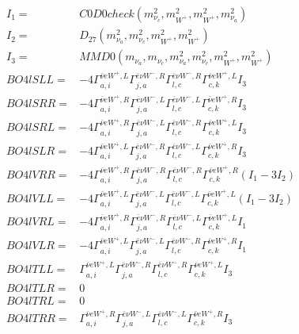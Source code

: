 \documentclass[A4,landscape]{article}
\begin{document}
\begin{align} 
I_1 = & C0D0check(m^2_{\nu_{{c}}}, m^2_{W^+}, m^2_{W^+}, m^2_{\nu_{{a}}}) \\ 
I_2 = & D_{27}(m^2_{\nu_{{a}}}, m^2_{\nu_{{c}}}, m^2_{W^+}, m^2_{W^+}) \\ 
I_3 = & MMD0(m_{\nu_{{a}}}, m_{\nu_{{c}}}, m^2_{\nu_{{a}}}, m^2_{\nu_{{c}}}, m^2_{W^+}, m^2_{W^+}) \\ 
  BO4lSLL= & -4  \Gamma^{\bar{\nu}e W^+ ,L}_{a, i} \Gamma^{\bar{e}\nu W^-,R}_{j, a} \Gamma^{\bar{e}\nu W^-,R}_{l, c} \Gamma^{\bar{\nu}e W^+ ,L}_{c, k} I_3 \\ 
  BO4lSRR= & -4  \Gamma^{\bar{\nu}e W^+ ,R}_{a, i} \Gamma^{\bar{e}\nu W^-,L}_{j, a} \Gamma^{\bar{e}\nu W^-,L}_{l, c} \Gamma^{\bar{\nu}e W^+ ,R}_{c, k} I_3 \\ 
  BO4lSRL= & -4  \Gamma^{\bar{\nu}e W^+ ,R}_{a, i} \Gamma^{\bar{e}\nu W^-,L}_{j, a} \Gamma^{\bar{e}\nu W^-,R}_{l, c} \Gamma^{\bar{\nu}e W^+ ,L}_{c, k} I_3 \\ 
  BO4lSLR= & -4  \Gamma^{\bar{\nu}e W^+ ,L}_{a, i} \Gamma^{\bar{e}\nu W^-,R}_{j, a} \Gamma^{\bar{e}\nu W^-,L}_{l, c} \Gamma^{\bar{\nu}e W^+ ,R}_{c, k} I_3 \\ 
  BO4lVRR= & -4  \Gamma^{\bar{\nu}e W^+ ,R}_{a, i} \Gamma^{\bar{e}\nu W^-,R}_{j, a} \Gamma^{\bar{e}\nu W^-,R}_{l, c} \Gamma^{\bar{\nu}e W^+ ,R}_{c, k} (I_1 - 3 I_2) \\ 
  BO4lVLL= & -4  \Gamma^{\bar{\nu}e W^+ ,L}_{a, i} \Gamma^{\bar{e}\nu W^-,L}_{j, a} \Gamma^{\bar{e}\nu W^-,L}_{l, c} \Gamma^{\bar{\nu}e W^+ ,L}_{c, k} (I_1 - 3 I_2) \\ 
  BO4lVRL= & -4  \Gamma^{\bar{\nu}e W^+ ,R}_{a, i} \Gamma^{\bar{e}\nu W^-,R}_{j, a} \Gamma^{\bar{e}\nu W^-,L}_{l, c} \Gamma^{\bar{\nu}e W^+ ,L}_{c, k} I_1 \\ 
  BO4lVLR= & -4  \Gamma^{\bar{\nu}e W^+ ,L}_{a, i} \Gamma^{\bar{e}\nu W^-,L}_{j, a} \Gamma^{\bar{e}\nu W^-,R}_{l, c} \Gamma^{\bar{\nu}e W^+ ,R}_{c, k} I_1 \\ 
  BO4lTLL= &  \Gamma^{\bar{\nu}e W^+ ,L}_{a, i} \Gamma^{\bar{e}\nu W^-,R}_{j, a} \Gamma^{\bar{e}\nu W^-,R}_{l, c} \Gamma^{\bar{\nu}e W^+ ,L}_{c, k} I_3 \\ 
  BO4lTLR= & 0 \\ 
  BO4lTRL= & 0 \\ 
  BO4lTRR= &  \Gamma^{\bar{\nu}e W^+ ,R}_{a, i} \Gamma^{\bar{e}\nu W^-,L}_{j, a} \Gamma^{\bar{e}\nu W^-,L}_{l, c} \Gamma^{\bar{\nu}e W^+ ,R}_{c, k} I_3 \\ 
\end{align} 
\end{document}
